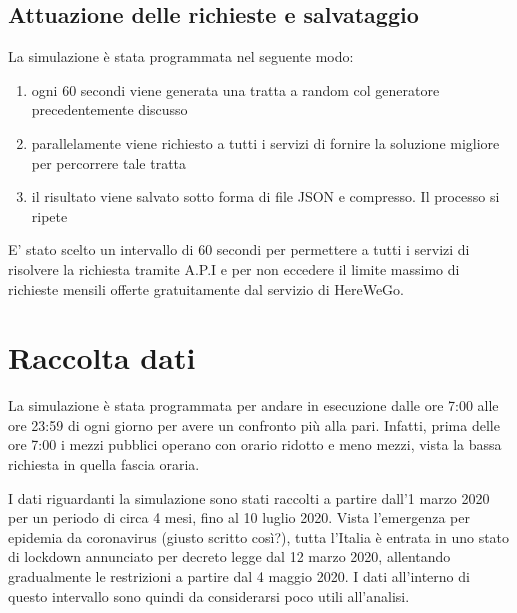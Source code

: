 \subsection{Attuazione delle richieste e salvataggio}

La simulazione è stata programmata nel seguente modo:
\begin{enumerate}
\item ogni 60 secondi viene generata una tratta a random col generatore precedentemente discusso
\item parallelamente viene richiesto a tutti i servizi di fornire la soluzione migliore per percorrere tale tratta
\item il risultato viene salvato sotto forma di file JSON e compresso. Il processo si ripete
\end{enumerate}
E' stato scelto un intervallo di 60 secondi per permettere a tutti i servizi di risolvere la richiesta tramite A.P.I e per non eccedere il limite massimo di richieste mensili offerte gratuitamente dal servizio di HereWeGo.



\section{Raccolta dati}

La simulazione è stata programmata per andare in esecuzione dalle ore 7:00 alle ore 23:59 di ogni giorno per avere un confronto più alla pari. Infatti, prima delle ore 7:00 i mezzi pubblici operano con orario ridotto e meno mezzi, vista la bassa richiesta in quella fascia oraria.

I dati riguardanti la simulazione sono stati raccolti a partire dall'1 marzo 2020 per un periodo di circa 4 mesi, fino al 10 luglio 2020. Vista l'emergenza per epidemia da coronavirus (giusto scritto così?), tutta l'Italia è entrata in uno stato di lockdown annunciato per decreto legge dal 12 marzo 2020, allentando gradualmente le restrizioni a partire dal 4 maggio 2020. I dati all'interno di questo intervallo sono quindi da considerarsi poco utili all'analisi.

